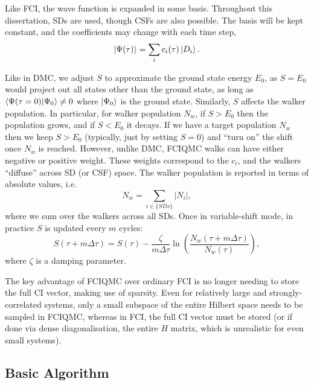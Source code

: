 Like \gls{FCI}, the wave function is expanded in some basis. Throughout this dissertation, \glspl{SD} are used, though \glspl{CSF} are also possible.\supercite{dobrautzEfficient2019} The basis will be kept constant, and the coefficients may change with each time step,
\begin{equation}
    \ket{\Psi(\tau)} = \sum_i c_i(\tau)\ket{D_i}.
\end{equation}

Like in \gls{DMC}, we adjust $S$ to approximate the ground state energy $E_0$, as $S=E_0$ would project out all states other than the ground state, as long as $\braket{\Psi(\tau=0)}{\Psi_0}\neq 0$ where $\ket{\Psi_0}$ is the ground state. Similarly, $S$ affects the walker population. In particular, for walker population $N_w$, if $S>E_0$ then the population grows, and if $S<E_0$ it decays. If we have a target population $N_w$ then we keep $S>E_0$ (typically, just by setting $S=0$) and ``turn on'' the shift once $N_w$ is reached. However, unlike DMC, \gls{FCIQMC} walks can have either negative or positive weight. These weights correspond to the $c_i$, and the walkers ``diffuse'' across \gls{SD} (or \gls{CSF}) space. The walker population is reported in terms of absolute values, i.e.
\begin{equation}
    N_w = \sum_{i\in\{SDs\}}|N_i|,
\end{equation}
where we sum over the walkers across all \glspl{SD}. Once in variable-shift mode, in practice $S$ is updated every $m$ cycles:
\begin{equation}
    S(\tau+m\Delta\tau) = S(\tau) - \frac{\zeta}{m\Delta\tau}\ln\left(\frac{N_w(\tau+m\Delta\tau)}{N_w(\tau)}\right),
\end{equation}
where $\zeta$ is a damping parameter.

The key advantage of \gls{FCIQMC} over ordinary \gls{FCI} is no longer needing to store the full \gls{CI} vector, making use of sparsity. Even for relatively large and strongly-correlated systems, only a small subspace of the entire Hilbert space needs to be sampled in FCIQMC, whereas in FCI, the full CI vector must be stored (or if done via dense diagonalisation, the entire $H$ matrix, which is unrealistic for even small systems).

\subsection{Basic Algorithm}

